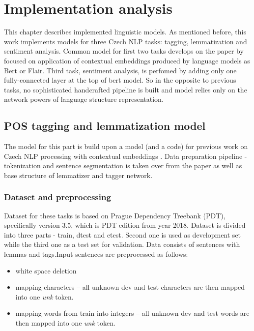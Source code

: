 \chapter{Implementation analysis}
\label{chap:impl}
This chapter describes implemented linguistic models. As mentioned before, this work implements models for three Czech NLP tasks: tagging, lemmatization and sentiment analysis. Common model for first two tasks develops on the paper by \cite[]{straka2019czech} focused on application of contextual embeddings produced by language models as Bert %
 or Flair. %
 Third task, sentiment analysis, is perfomed by adding only one fully-connected layer at the top of bert model. So in the opposite to previous tasks, no sophisticated handcrafted pipeline is built and model relies only on the network powers of language structure representation.
 \section{POS tagging and lemmatization model}
The model for this part is build upon a model (and a code) for previous work on Czech NLP processing with contextual embeddings \cite[]{straka2019czech}. Data preparation %
pipeline - tokenization and sentence segmentation is taken over from the paper as well as base structure of lemmatizer and tagger network. 


\subsection{Dataset and preprocessing}
Dataset for these tasks is based on Prague Dependency Treebank (PDT), specifically version 3.5, which is PDT edition from year 2018. Dataset is divided into three parts - train, dtest and etest. Second one is used as development set while the third one as a test set for validation. %
Data consists of sentences with lemmas and tags.Input sentences are preprocessed as follows:
\begin{itemize}
\item white space deletion
\item mapping characters -- all unknown dev and test characters are then mapped into one \textit{unk} token. 
\item mapping  words from train into integers -- all unknown dev and test words are then mapped into one \textit{unk} token. 
\end{itemize}




